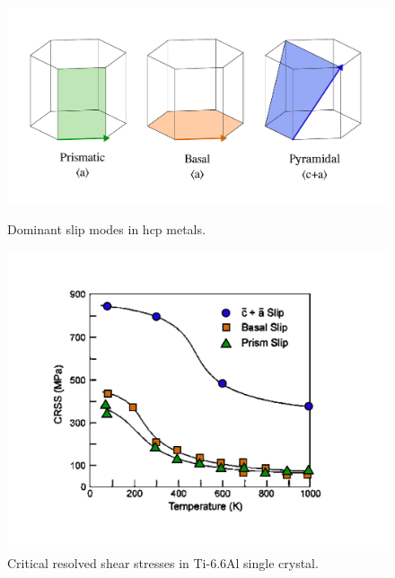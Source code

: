 \begin{figure}[h!]
\centering
  \includegraphics[width=\textwidth]{Figures/slip_systems.pdf}
  \caption{Dominant slip modes in hcp metals.\label{fig.hcp-deformation}}
  \includegraphics[width=\textwidth]{Figures/CRSS_plot.pdf}
  \caption{Critical resolved shear stresses in Ti-6.6Al single crystal\cite{lütjering2013titanium}.\label{fig.CRSS} }
\end{figure}

